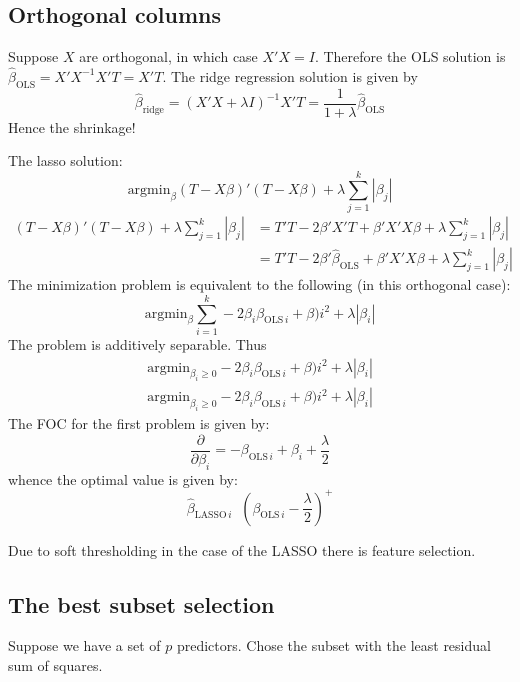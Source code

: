 \documentclass[a4paper]{article}
\newcommand{\brac}[1]{{\left ( #1 \right )}}
\newcommand{\abs}[1]{{\left | #1 \right |}}
\newcommand{\defn}{\mathop{\overset{\Delta}{=}}\nolimits}
\begin{document}
\subsection*{Orthogonal columns} %
\label{sub:orthogonal_columns}

Suppose $X$ are orthogonal, in which case $X'X = I$. Therefore
the OLS solution is $\hat{\beta}_{\text{OLS}} = {X'X}^{-1}X'T = X'T$.
The ridge regression solution is given by 
\[\hat{\beta}_{\text{ridge}} = \brac{X'X + \lambda I}^{-1} X'T = \frac{1}{1+\lambda} \hat{\beta}_{\text{OLS}}\]
Hence the shrinkage!

The lasso solution:
\[\text{argmin}_\beta \brac{T - X\beta}'\brac{T - X\beta} + \lambda \sum_{j=1}^k \abs{\beta_j}\]
\begin{align*}
	\brac{T - X\beta}'\brac{T - X\beta} + \lambda \sum_{j=1}^k \abs{\beta_j}
	& = T'T - 2 \beta'X'T + \beta'X'X\beta + \lambda \sum_{j=1}^k \abs{\beta_j}\\
	& = T'T - 2 \beta'\hat{\beta}_{\text{OLS}} + \beta'X'X\beta + \lambda \sum_{j=1}^k \abs{\beta_j}
\end{align*}
The minimization problem is equivalent to the following (in this orthogonal case):
\[\text{argmin}_\beta \sum_{i=1}^k -2 \beta_i \beta_{\text{OLS}\,i}+ \beta)i^2 + \lambda \abs{\beta_i}\]
The problem is additively separable. Thus \begin{align*}
	\text{argmin}_{\beta_i\geq 0} -2 \beta_i \beta_{\text{OLS}\,i}+ \beta)i^2 + \lambda \abs{\beta_i}\\
	\text{argmin}_{\beta_i\geq 0} -2 \beta_i \beta_{\text{OLS}\,i}+ \beta)i^2 + \lambda \abs{\beta_i}
\end{align*}
The FOC for the first problem is given by:
\[\frac{\partial}{\partial \beta_i} = - \beta_{\text{OLS}\,i} + \beta_i + \frac{\lambda}{2}\]
whence the optimal value is given by:
\[\hat{\beta}_{\text{LASSO}\,i} \defn \brac{ \beta_{\text{OLS}\,i} - \frac{\lambda}{2} }^+\]

Due to soft thresholding in the case of the LASSO there is feature selection.


\subsection*{The best subset selection} %
\label{sub:the_best_subset_selection}
Suppose we have a set of $p$ predictors. Chose the subset with the least
residual sum of squares.
\end{document}

